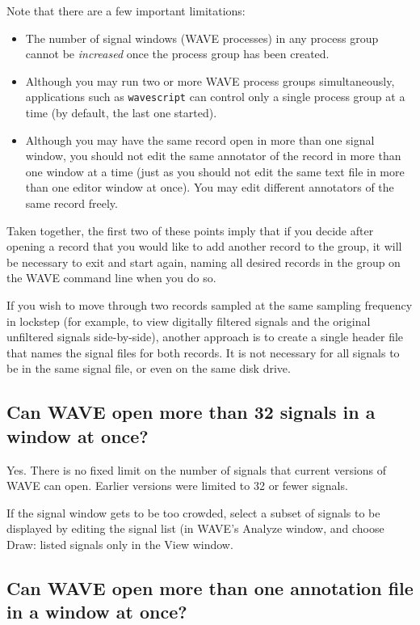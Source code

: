 \documentclass[twoside]{book}
\newcommand{\WAVE}{{\sf WAVE}\xspace}
\begin{document}
Note that there are a few important limitations:
\begin{itemize}
\item
The number of signal windows (\WAVE{} processes) in any process group cannot
be \emph{increased} once the process group has been created.  

\item
Although you may run two or more \WAVE{} process groups simultaneously,
applications such as {\tt wavescript} can control only a single process group
at a time (by default, the last one started).

\item
Although you may have the same record open in more than one signal window, you
should not edit the same annotator of the record in more than one window at a
time (just as you should not edit the same text file in more than one editor
window at once).  You may edit different annotators of the same record
freely.
\end{itemize}

Taken together, the first two of these points imply that if you decide after
opening a record that you would like to add another record to the group, it
will be necessary to exit and start again, naming all desired records in the
group on the \WAVE{} command line when you do so.

If you wish to move through two records sampled at the same sampling
frequency in lockstep (for example, to view digitally filtered signals
and the original unfiltered signals side-by-side), another approach is
to create a single header file that names the signal files for both
records.  It is not necessary for all signals to be in the same signal
file, or even on the same disk drive.

\subsection{Can \WAVE{} open more than 32 signals in a window at once?}

Yes.  There is no fixed limit on the number of signals that current versions
of \WAVE{} can open.  Earlier versions were limited to 32 or fewer signals.

If the signal window gets to be too crowded, select a subset of
signals to be displayed by editing the signal list (in \WAVE{}'s {\sf
Analyze} window, and choose {\sf Draw: listed signals only} in the
{\sf View} window.

\subsection{Can \WAVE{} open more than one annotation file in a window at once?}
\end{document}
